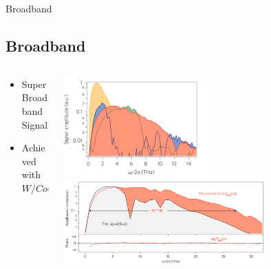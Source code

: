 \documentclass[aspectratio=1610, 9pt]{beamer}
\begin{document}
\begin{frame}{Broadband}
  \subsection{Broadband}
  \begin{columns}
    \begin{column}{.3\textwidth}
      \begin{itemize}
        \item Super Broadband Signal
        \vspace{0.3in}
        \item Achieved with $W/Co40 Fe40 B 20 /Pt\;(\SI{5.8}{\nano\meter})$
      \end{itemize}
    \end{column}
    \begin{column}{.7\textwidth}
      \begin{center}
      \includegraphics[width=0.5\textwidth]{pics/broadband_comnpar.png} 
      \includegraphics[width=0.7\textwidth]{pics/broadband.png}
      \end{center}
    \end{column}
  \end{columns}
\end{frame}
\end{document}
